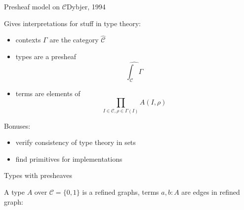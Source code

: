 \documentclass[english,draft]{beamer}
\begin{document}
\begin{frame}{Presheaf model on $\mathcal{C}$}{Dybjer, 1994}
 
 Gives interpretations for stuff in type theory:
 \begin{itemize}
  \item contexts $\Gamma$ are the category $\widehat{\mathcal{C}}$
  \item types are a presheaf $$\widehat{\int_{\mathcal{C}} \Gamma}$$
  \item terms are elements of $$\prod _{I \in \mathcal{C}, \rho \in \Gamma (I)} A(I,\rho)$$
 \end{itemize}

 \pause
 
 Bonuses:
 
 \begin{itemize}
  \item verify consistency of type theory in sets
  \item find primitives for implementations
 \end{itemize}
 
\end{frame}

\begin{frame}{Types with presheaves}

  \begin{example}
  A type $A$  over $\mathcal{C} = \{0,1\}$ is a refined graphs,   
  terms $a,b:A$ are edges in refined graph:
  \begin{figure}\label{depgraphdiag}
\begin{center} 
  
\end{center}    
  \end{figure}
 \end{example}
\end{frame}
\end{document}

